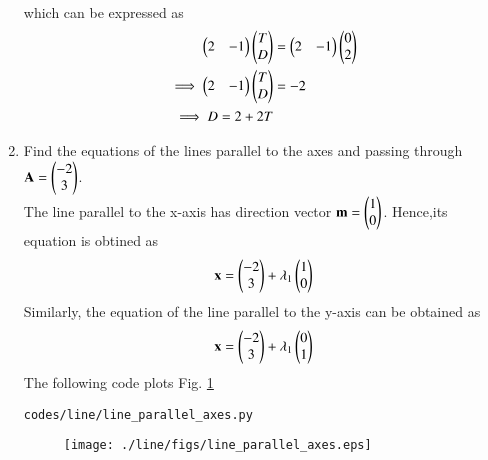 \begin{enumerate}[label=\arabic*.,ref=\thesubsection.\theenumi]
\begin{align}
\end{align}
%
which can be expressed as
\begin{align}
\begin{pmatrix}2 & -1\end{pmatrix}\begin{pmatrix}T\\D\end{pmatrix} &= \begin{pmatrix}2 & -1\end{pmatrix}\begin{pmatrix}0\\2\end{pmatrix}\\
\implies \begin{pmatrix}2 & -1\end{pmatrix}\begin{pmatrix}T\\D\end{pmatrix} &= -2
\\
\implies D = 2+2T
\end{align}
%
\item Find the equations of the lines parallel to the axes and passing through $\mathbf{A}=\begin{pmatrix}-2\\3\end{pmatrix}$.
%
\\
\solution The line parallel to the x-axis has direction vector $\mathbf{m}=\begin{pmatrix}1\\0\end{pmatrix}$.  Hence,its equation is obtined as
\begin{align}
%
\label{eq:line_dir_vec}
\vec{x} = \myvec{-2\\3} + \lambda_1\myvec{1\\0}
\end{align}
%
Similarly, the equation of the line parallel to the y-axis can be obtained as
\begin{align}
\mathbf{x} = \begin{pmatrix}-2\\3\end{pmatrix} + \lambda_1\begin{pmatrix}0\\1\end{pmatrix}
\end{align}
%
The following code plots Fig. \ref{fig:line_parallel_axes}
%
\begin{lstlisting}
codes/line/line_parallel_axes.py
\end{lstlisting}
%
\begin{figure}[!ht]
\texttt{[image: ./line/figs/line\_parallel\_axes.eps]}
\caption{}
\label{fig:line_parallel_axes}
\end{figure}


\end{enumerate}
